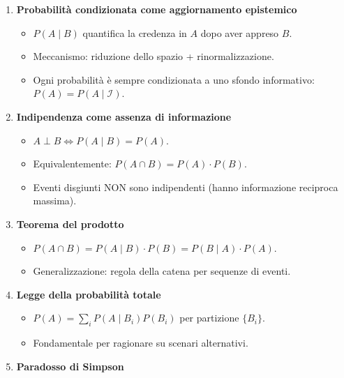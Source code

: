 \documentclass[
  italian,
  letterpaper,
  a4paper,
  11pt,
  open=any]{scrbook}
\providecommand{\tightlist}{%
  \setlength{\itemsep}{0pt}\setlength{\parskip}{0pt}}
\theoremstyle{plain}
\theoremstyle{definition}
\theoremstyle{definition}
\theoremstyle{remark}
\begin{document}
\begin{tcolorbox}[enhanced jigsaw, arc=.35mm, bottomrule=.15mm, bottomtitle=1mm, breakable, colback=white, colbacktitle=quarto-callout-important-color!10!white, colframe=quarto-callout-important-color-frame, coltitle=black, left=2mm, leftrule=.75mm, opacityback=0, opacitybacktitle=0.6, rightrule=.15mm, title=\textcolor{quarto-callout-important-color}{\faExclamation}\hspace{0.5em}{Importante}, titlerule=0mm, toprule=.15mm, toptitle=1mm]

\begin{enumerate}
\def\labelenumi{\arabic{enumi}.}
\tightlist
\item
  \textbf{Probabilità condizionata come aggiornamento epistemico}

  \begin{itemize}
  \tightlist
  \item
    \(P(A \mid B)\) quantifica la credenza in \(A\) dopo aver appreso
    \(B\).
  \item
    Meccanismo: riduzione dello spazio + rinormalizzazione.
  \item
    Ogni probabilità è sempre condizionata a uno sfondo informativo:
    \(P(A) = P(A \mid \mathcal{I})\).
  \end{itemize}
\item
  \textbf{Indipendenza come assenza di informazione}

  \begin{itemize}
  \tightlist
  \item
    \(A \perp B \iff P(A \mid B) = P(A)\).
  \item
    Equivalentemente: \(P(A \cap B) = P(A) \cdot P(B)\).
  \item
    Eventi disgiunti NON sono indipendenti (hanno informazione reciproca
    massima).
  \end{itemize}
\item
  \textbf{Teorema del prodotto}

  \begin{itemize}
  \tightlist
  \item
    \(P(A \cap B) = P(A \mid B) \cdot P(B) = P(B \mid A) \cdot P(A)\).
  \item
    Generalizzazione: regola della catena per sequenze di eventi.
  \end{itemize}
\item
  \textbf{Legge della probabilità totale}

  \begin{itemize}
  \tightlist
  \item
    \(P(A) = \sum_{i} P(A \mid B_i) P(B_i)\) per partizione \(\{B_i\}\).
  \item
    Fondamentale per ragionare su scenari alternativi.
  \end{itemize}
\item
  \textbf{Paradosso di Simpson}


\end{enumerate}
\end{tcolorbox}
\end{document}
